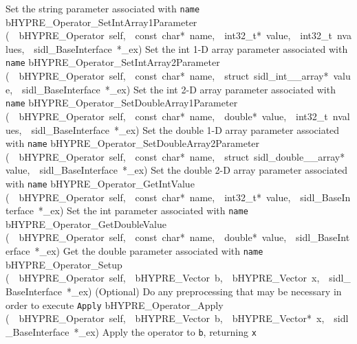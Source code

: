 \documentclass{article}
\begin{document}
\begin{cxxentry}
\begin{cxxnames}
        {
Set the string parameter associated with {\tt name}}
        {}
\label{cxx.2.8}
        {bHYPRE\_Operator\_SetIntArray1Parameter}
        {(\ \ bHYPRE\_Operator\ self,\ \ const\ char*\ name,\ \ int32\_t*\ value,\ \ int32\_t\ nvalues,\ \ sidl\_BaseInterface\ *\_ex)}
        {
Set the int 1-D array parameter associated with {\tt name}}
        {}
\label{cxx.2.9}
        {bHYPRE\_Operator\_SetIntArray2Parameter}
        {(\ \ bHYPRE\_Operator\ self,\ \ const\ char*\ name,\ \ struct\ sidl\_int\_\_array*\ value,\ \ sidl\_BaseInterface\ *\_ex)}
        {
Set the int 2-D array parameter associated with {\tt name}}
        {}
\label{cxx.2.10}
        {bHYPRE\_Operator\_SetDoubleArray1Parameter}
        {(\ \ bHYPRE\_Operator\ self,\ \ const\ char*\ name,\ \ double*\ value,\ \ int32\_t\ nvalues,\ \ sidl\_BaseInterface\ *\_ex)}
        {
Set the double 1-D array parameter associated with {\tt name}}
        {}
\label{cxx.2.11}
        {bHYPRE\_Operator\_SetDoubleArray2Parameter}
        {(\ \ bHYPRE\_Operator\ self,\ \ const\ char*\ name,\ \ struct\ sidl\_double\_\_array*\ value,\ \ sidl\_BaseInterface\ *\_ex)}
        {
Set the double 2-D array parameter associated with {\tt name}}
        {}
\label{cxx.2.12}
        {bHYPRE\_Operator\_GetIntValue}
        {(\ \ bHYPRE\_Operator\ self,\ \ const\ char*\ name,\ \ int32\_t*\ value,\ \ sidl\_BaseInterface\ *\_ex)}
        {
Set the int parameter associated with {\tt name}}
        {}
\label{cxx.2.13}
        {bHYPRE\_Operator\_GetDoubleValue}
        {(\ \ bHYPRE\_Operator\ self,\ \ const\ char*\ name,\ \ double*\ value,\ \ sidl\_BaseInterface\ *\_ex)}
        {
Get the double parameter associated with {\tt name}}
        {}
\label{cxx.2.14}
        {bHYPRE\_Operator\_Setup}
        {(\ \ bHYPRE\_Operator\ self,\ \ bHYPRE\_Vector\ b,\ \ bHYPRE\_Vector\ x,\ \ sidl\_BaseInterface\ *\_ex)}
        {
(Optional) Do any preprocessing that may be necessary in
order to execute {\tt Apply}}
        {}
\label{cxx.2.15}
        {bHYPRE\_Operator\_Apply}
        {(\ \ bHYPRE\_Operator\ self,\ \ bHYPRE\_Vector\ b,\ \ bHYPRE\_Vector*\ x,\ \ sidl\_BaseInterface\ *\_ex)}
        {
Apply the operator to {\tt b}, returning {\tt x}}
        {}
\label{cxx.2.16}

\end{cxxnames}
\end{cxxentry}
\end{document}
